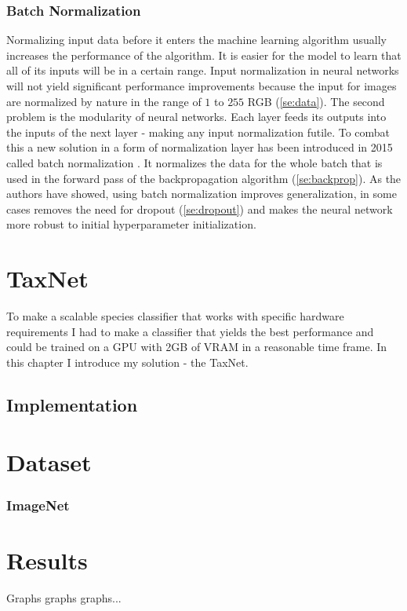 \documentclass[times, utf8, diplomski]{fer}
\begin{document}
\subsection{Batch Normalization}
\label{se:batch_norm}

Normalizing input data before it enters the machine learning algorithm usually increases the performance of the algorithm. It is easier for the model to learn that all of its inputs will be in a certain range. Input normalization in neural networks will not yield significant performance improvements because the input for images are normalized by nature in the range of $1$ to $255$ RGB (\ref{se:data}). The second problem is the modularity of neural networks. Each layer feeds its outputs into the inputs of the next layer - making any input normalization futile. To combat this a new solution in a form of normalization layer has been introduced in 2015 called batch normalization \citep{ioffe_batch_2015}. It normalizes the data for the whole batch that is used in the forward pass of the backpropagation algorithm (\ref{se:backprop}). As the authors have showed, using batch normalization improves generalization, in some cases removes the need for dropout (\ref{se:dropout}) and makes the neural network more robust to initial hyperparameter initialization.

\chapter{TaxNet}
To make a scalable species classifier that works with specific hardware requirements I had to make a classifier that yields the best performance and could be trained on a GPU with 2GB of VRAM in a reasonable time frame. In this chapter I introduce my solution - the TaxNet.


\section{Implementation}

\chapter{Dataset}
\subsection{ImageNet}

\chapter{Results}
Graphs graphs graphs...
\end{document}
